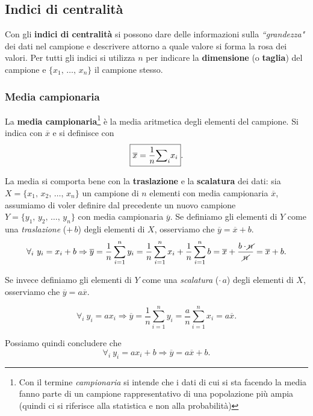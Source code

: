 \subsection{Indici di centralità}
Con gli \textbf{indici di centralità} si possono dare delle informazioni sulla \textit{``grandezza"} dei dati nel campione e descrivere attorno a quale valore si forma la rosa dei valori.
Per tutti gli indici si utilizza $n$ per indicare la \textbf{dimensione} (o \textbf{taglia}) del campione e $\{x_1, \, \dots, \, x_n\}$ il campione stesso.

\subsubsection{Media campionaria}
\begin{flushleft}
La \textbf{media campionaria}\footnote{Con il termine \textit{campionaria} si intende che i dati di cui si sta facendo la media fanno parte di un campione rappresentativo di una popolazione più ampia (quindi ci si riferisce alla statistica e non alla probabilità)} è la media aritmetica degli elementi del campione. 
Si indica con $\overline x$ e si definisce con $$
\boxed{
    \overline{x} = \frac{1}{n}{\sum}_i{x_i}
}.
$$

La media si comporta bene con la \textbf{traslazione} e la \textbf{scalatura} dei dati: sia $X = \{x_1, \, x_2, \, \dots, \, x_n\}$ un campione di $n$ elementi con media campionaria $\overline x$, assumiamo di voler definire dal precedente un nuovo campione $Y = \{ y_1, \, y_2, \, \dots, \, y_n \}$ con media campionaria $\overline y$. 
\newline 
Se definiamo gli elementi di $Y$ come una \textit{traslazione} ($+ \, b$) degli elementi di $X$, osserviamo che $\overline y = \overline x + b$.
\[
\forall_i \ 
y_i = x_i + b \Rightarrow \overline{y} = \frac{1}{n}\sum\limits_{i=1}^{n}{y_i} = \frac{1}{n}\sum\limits_{i=1}^{n}{x_i} + \frac{1}{n}\sum\limits_{i=1}^{n}{b} = \overline{x} + \frac{b \cdot \cancel{n}}{\cancel{n}} = \overline{x} + b.
\]

Se invece definiamo gli elementi di $Y$ come una \textit{scalatura} ($\cdot \, a$) degli elementi di $X$, osserviamo che $\overline y = a \overline x$.

\setlength\abovedisplayskip{1pt}

$$
\forall_i \ y_i = ax_i \Rightarrow \overline{y} = \frac{1}{n}\sum\limits_{i=1}^{n}{y_i} = \frac{a}{n}\sum\limits_{i=1}^{n}{x_i} = a\overline{x}.
$$


Possiamo quindi concludere che 
\[
\boxed{
    \forall_i \ y_i = ax_i + b \Rightarrow 
    \overline{y} = a\overline{x} + b
} .
\]
\end{flushleft} 
